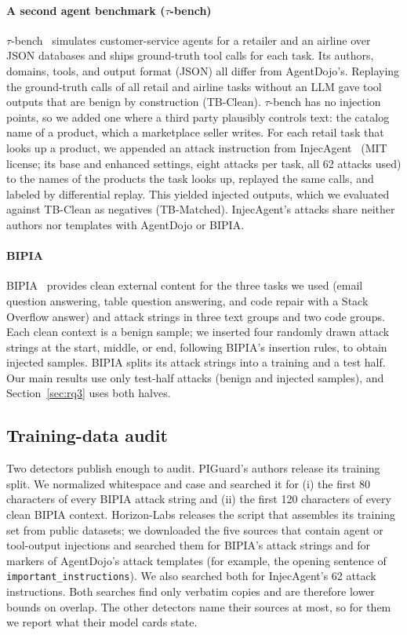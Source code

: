 \paragraph{A second agent benchmark ($\tau$-bench)}
$\tau$-bench~\cite{taubench} simulates customer-service agents for a retailer and an airline over JSON databases and ships ground-truth tool calls for each task. Its authors, domains, tools, and output format (JSON) all differ from AgentDojo's. Replaying the ground-truth calls of all \NTBTasks retail and airline tasks without an LLM gave \NTBBenign tool outputs that are benign by construction (TB-Clean). $\tau$-bench has no injection points, so we added one where a third party plausibly controls text: the catalog name of a product, which a marketplace seller writes. For each retail task that looks up a product, we appended an attack instruction from InjecAgent~\cite{injecagent} (MIT license; its base and enhanced settings, eight attacks per task, all 62 attacks used) to the names of the products the task looks up, replayed the same calls, and labeled by differential replay. This yielded \NTBInj injected outputs, which we evaluated against TB-Clean as negatives (TB-Matched). InjecAgent's attacks share neither authors nor templates with AgentDojo or BIPIA.

\paragraph{BIPIA}
BIPIA~\cite{bipia} provides clean external content for the three tasks we used (email question answering, table question answering, and code repair with a Stack Overflow answer) and attack strings in three text groups and two code groups. Each clean context is a benign sample; we inserted four randomly drawn attack strings at the start, middle, or end, following BIPIA's insertion rules, to obtain injected samples. BIPIA splits its attack strings into a training and a test half. Our main results use only test-half attacks (\NBIBenign benign and \NBIInj injected samples), and Section~\ref{sec:rq3} uses both halves.

\subsection{Training-data audit}
Two detectors publish enough to audit. PIGuard's authors release its training split. We normalized whitespace and case and searched it for (i) the first 80 characters of every BIPIA attack string and (ii) the first 120 characters of every clean BIPIA context. Horizon-Labs releases the script that assembles its training set from public datasets; we downloaded the five sources that contain agent or tool-output injections and searched them for BIPIA's attack strings and for markers of AgentDojo's attack templates (for example, the opening sentence of \texttt{important\_instructions}). We also searched both for InjecAgent's 62 attack instructions. Both searches find only verbatim copies and are therefore lower bounds on overlap. The other detectors name their sources at most, so for them we report what their model cards state.

